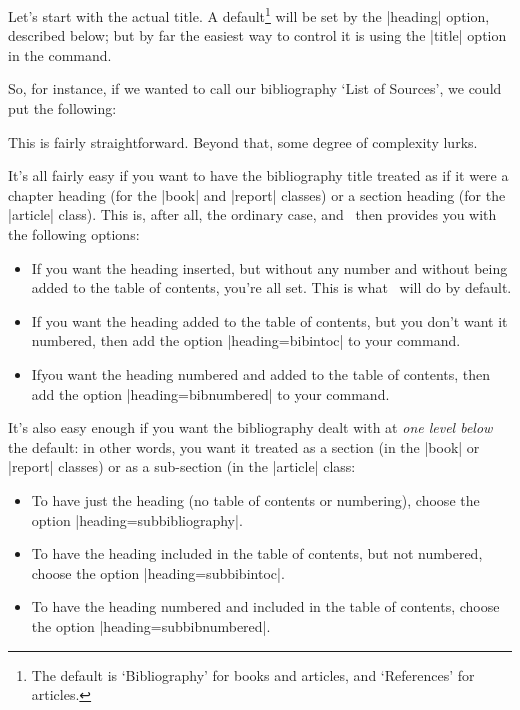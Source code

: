 Let's start with the actual title. A default\footnote{The default is
  `Bibliography' for books and articles, and `References' for
  articles.} will be set by the |heading| option, described below; but
by far the easiest way to control it is using the |title| option in
the  command.

So, for instance, if we wanted to call our bibliography `List of
Sources', we could put the following:
\begin{center}
\end{center}

This is fairly straightforward. Beyond that, some degree of complexity
lurks.

It's all fairly easy if you want to have the bibliography title
treated as if it were a chapter heading (for the |book| and |report|
classes) or a section heading (for the |article| class). This is,
after all, the ordinary case, and \biblatex\ then provides you with
the following options:
\begin{itemize}
\item If you want the heading inserted, but without any
  number and without being added to the table of contents, you're all
  set. This is what \biblatex\ will do by default.
\item If you want the heading added to the table of contents,
  but you don't want it numbered, then add the option
  |heading=bibintoc| to your  command.
\item Ifyou want the heading numbered and added to the table
  of contents, then add the option |heading=bibnumbered| to your
   command.
\end{itemize}

It's also easy enough if you want the bibliography dealt with at
\emph{one level below} the default: in other words, you want it
treated as a section (in the |book| or |report| classes) or
as a sub-section (in the |article| class:
\begin{itemize}
\item To have just the heading (no table of contents or numbering),
  choose the option |heading=subbibliography|.
\item To have the heading included in the table of contents, but not
  numbered, choose the option |heading=subbibintoc|.
\item To have the heading numbered and included in the table of
  contents, choose the option |heading=subbibnumbered|.
\end{itemize}

